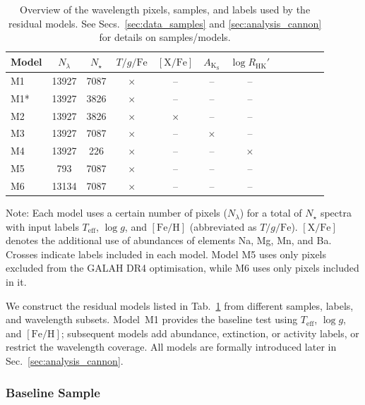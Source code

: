 \documentclass[twocolumn,apj,numberedappendix,appendixfloats]{openjournal}
\begin{document}
\begin{table}
\centering
\caption{Overview of the wavelength pixels, samples, and labels used by the residual models. See Secs.~\ref{sec:data_samples} and \ref{sec:analysis_cannon} for details on samples/models.}
\label{tab:residual_models}
\begin{tabular}{lccccccccccc}
\hline\hline
Model & $N_\lambda$ & $N_\star$ & $T/g/\mathrm{Fe}$ & $\mathrm{[X/Fe]}$ & $A_\mathrm{K_S}$ & $\log R_\mathrm{HK}'$ \\
\hline
\textcolor{M1}{M1} & 13927 & 7087 & $\times$ & -- & -- & -- \\
\textcolor{M1}{M1*} & 13927 & 3826 & $\times$ & -- & -- & -- \\
\textcolor{M2}{M2} & 13927 & 3826 & $\times$ & $\times$ & -- & -- \\
\textcolor{M3}{M3} & 13927 & 7087 & $\times$ & -- & $\times$ & -- \\
\textcolor{M4}{M4} & 13927 &  226 & $\times$ & -- &  --  & $\times$ \\
\textcolor{M5}{M5} &   793 & 7087 & $\times$ & -- & -- & -- \\
\textcolor{M6}{M6} & 13134 & 7087 & $\times$ & -- & -- & -- \\
\hline\hline
\end{tabular} \newline
\footnotesize{Note: Each model uses a certain number of pixels ($N_\lambda$) for a total of $N_\star$ spectra with input labels $T_\mathrm{eff}$, $\log g$, and $\mathrm{[Fe/H]}$ (abbreviated as $T/g/\mathrm{Fe}$). $\mathrm{[X/Fe]}$ denotes the additional use of abundances of elements Na, Mg, Mn, and Ba. Crosses indicate labels included in each model. Model \textcolor{M5}{M5} uses only pixels excluded from the GALAH DR4 optimisation, while \textcolor{M6}{M6} uses only pixels included in it.}
\end{table}

We construct the residual models listed in Tab.~\ref{tab:residual_models} from different samples, labels, and wavelength subsets. Model~\textcolor{M1}{M1} provides the baseline test using $T_\mathrm{eff}$, $\log g$, and $[\mathrm{Fe/H}]$; subsequent models add abundance, extinction, or activity labels, or restrict the wavelength coverage. All models are formally introduced later in Sec.~\ref{sec:analysis_cannon}.

\subsubsection{Baseline Sample}
\label{sec:sample_baseline}
\end{document}
